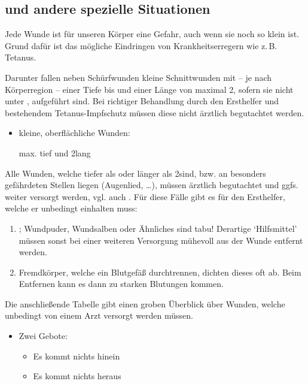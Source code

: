 \subsection{ und andere spezielle Situationen}

\Text
{{\TxBeschreibung}}%
{%
%
\label{topic:wunden-ehi}%
Jede Wunde ist für unseren Körper eine Gefahr, auch wenn sie noch so klein
ist. Grund dafür ist das mögliche Eindringen von Krankheitserregern wie z.\,B.
Tetanus.
}%
 

{%
Darunter fallen neben Schürfwunden kleine Schnittwunden mit 
-- je nach Körperregion -- 
einer Tiefe bis \CM* 
und einer Länge von maximal 2\CM*, 
sofern sie nicht unter 
, aufgeführt sind. 
Bei richtiger Behandlung durch den Ersthelfer 
und bestehendem Tetanus-Impfschutz 
müssen diese nicht ärztlich begutachtet werden.
}{
\begin{itemize}
  \item kleine, oberflächliche Wunden:
  
  max. \CM* tief und 2\CM* lang
\end{itemize}
}{}{}{}





{%
Alle Wunden, 
welche tiefer als \CM* 
oder länger als 2\CM* sind,
bzw. an besonders gefährdeten Stellen liegen 
(Augenlied, \ldots), 
müssen ärztlich begutachtet 
und ggfs. weiter versorgt werden, vgl. auch 
. 
Für diese Fälle
gibt es  für den Ersthelfer, 
welche er unbedingt einhalten muss:
\begin{enumerate}
  \item {}; 
  Wundpuder, 
  Wundsalben 
  oder Ähnliches sind tabu! 
  Derartige \enquote*{Hilfsmittel} müssen sonst bei einer weiteren Versorgung mühevoll aus der Wunde entfernt werden.
  \item {}
  Fremdkörper, 
  welche ein Blutgefäß durchtrennen, 
  dichten dieses oft ab. 
  Beim Entfernen kann es dann zu
  starken Blutungen kommen.
\end{enumerate}
 Die anschließende
Tabelle gibt einen groben Überblick über Wunden, welche unbedingt von einem
Arzt versorgt werden müssen.
}{
\begin{itemize}
  \item Zwei Gebote:
  \begin{itemize}
    \item Es kommt nichts hinein
    \item Es kommt nichts heraus
  \end{itemize}
\end{itemize}
}{}{}{}


